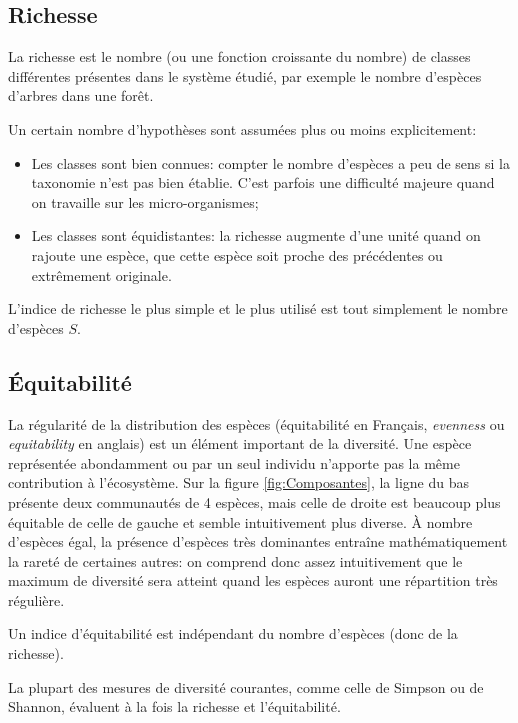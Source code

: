 \documentclass[
  11pt,
  american,
  a4paper,
  extrafontsizes,onecolumn,openright
  ]{memoir}
\providecommand{\tightlist}{%
  \setlength{\itemsep}{0pt}\setlength{\parskip}{0pt}}
\newlength{\rf}
\begin{document}
\subsection{Richesse}\label{richesse}

La richesse \autocite[terme introduit par][]{Mcintosh1967} est le nombre (ou une fonction croissante du nombre) de classes différentes présentes dans le système étudié, par exemple le nombre d'espèces d'arbres dans une forêt.

Un certain nombre d'hypothèses sont assumées plus ou moins explicitement:

\begin{itemize}
\tightlist
\item
  Les classes sont bien connues: compter le nombre d'espèces a peu de sens si la taxonomie n'est pas bien établie.
  C'est parfois une difficulté majeure quand on travaille sur les micro-organismes;
\item
  Les classes sont équidistantes: la richesse augmente d'une unité quand on rajoute une espèce, que cette espèce soit proche des précédentes ou extrêmement originale.
\end{itemize}

L'indice de richesse le plus simple et le plus utilisé est tout simplement le nombre d'espèces \(S\).

\subsection{Équitabilité}\label{uxe9quitabilituxe9}

La régularité de la distribution des espèces (équitabilité en Français, \emph{evenness} ou \emph{equitability} en anglais) est un élément important de la diversité.
Une espèce représentée abondamment ou par un seul individu n'apporte pas la même contribution à l'écosystème.
Sur la figure \ref{fig:Composantes}, la ligne du bas présente deux communautés de 4 espèces, mais celle de droite est beaucoup plus équitable de celle de gauche et semble intuitivement plus diverse.
À nombre d'espèces égal, la présence d'espèces très dominantes entraîne mathématiquement la rareté de certaines autres: on comprend donc assez intuitivement que le maximum de diversité sera atteint quand les espèces auront une répartition très régulière.

Un indice d'équitabilité est indépendant du nombre d'espèces (donc de la richesse).

La plupart des mesures de diversité courantes, comme celle de Simpson ou de Shannon, évaluent à la fois la richesse et l'équitabilité.
\end{document}

